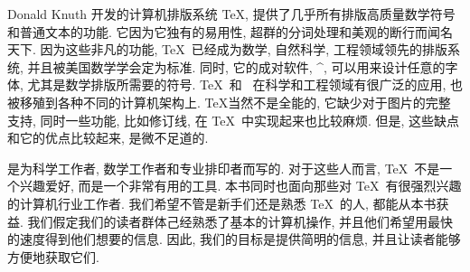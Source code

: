 


Donald Knuth 开发的计算机排版系统 \TeX,
提供了几乎所有排版高质量数学符号和普通文本的功能.
它因为它独有的易用性, 超群的分词处理和美观的断行而闻名天下.
因为这些非凡的功能, \TeX\ 已经成为数学, 自然科学, 工程领域领先的排版系统,
并且被美国数学学会定为标准.
同时, 它的成对软件, ^{\Metafont}, 可以用来设计任意的字体, 尤其是数学排版所需要的符号.
\TeX\ 和 \Metafont\ 在科学和工程领域有很广泛的应用,
也被移殖到各种不同的计算机架构上.
\TeX 当然不是全能的, 它缺少对于图片的完整支持,
同时一些功能, 比如修订线, 在 \TeX\ 中实现起来也比较麻烦.
但是, 这些缺点和它的优点比较起来, 是微不足道的.

\thisbook\/ 是为科学工作者, 数学工作者和专业排印者而写的.
对于这些人而言, \TeX\ 不是一个兴趣爱好, 而是一个非常有用的工具.
本书同时也面向那些对 \TeX\ 有很强烈兴趣的计算机行业工作者.
我们希望不管是新手们还是熟悉 \TeX\ 的人, 都能从本书获益.
我们假定我们的读者群体己经熟悉了基本的计算机操作,
并且他们希望用最快的速度得到他们想要的信息.
因此, 我们的目标是提供简明的信息, 并且让读者能够方便地获取它们.

